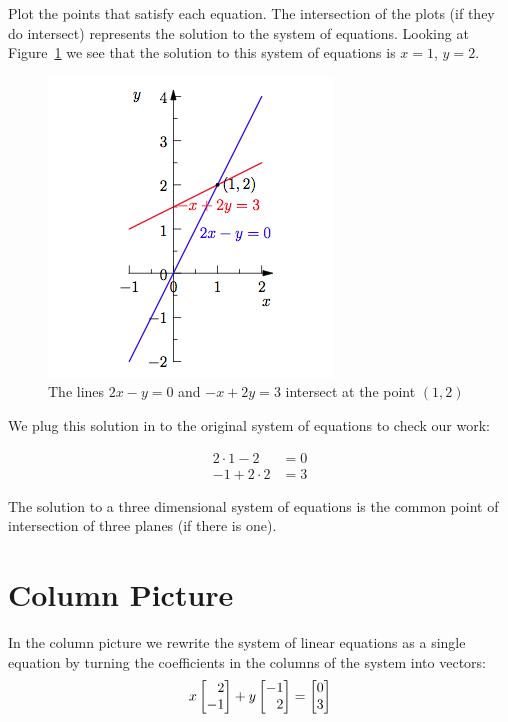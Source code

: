 \documentclass{ximera}
\begin{document}
Plot the points that satisfy each equation. The intersection of the
plots (if they do intersect) represents the solution to the system of
equations. Looking at Figure~\ref{fig:intplot} we see that the
solution to this system of equations is $x = 1$, $y = 2$.

\begin{figure}[H]\label{fig:intplot}
\begin{image}
\includegraphics{Geometry1.png}
\end{image}
\caption{The lines $2x - y = 0$ and $-x + 2y = 3$ intersect at the
  point $(1, 2)$}
\end{figure}

We plug this solution in to the original system of equations to check
our work:

\begin{align*}
2\cdot1-2 &= 0\\
-1+2\cdot2 &= 3
\end{align*}

The solution to a three dimensional system of equations is the common
point of intersection of three planes (if there is one).

\section*{Column Picture}

In the column picture we rewrite the system of linear equations as a
single equation by turning the coefficients in the columns of the
system into vectors:
\[
x\begin{bmatrix}\phantom{-} 2\\-1\end{bmatrix} + y\begin{bmatrix}-1\\\phantom{-}
  2\end{bmatrix} = \begin{bmatrix}0\\3\end{bmatrix}
\]
\end{document}
